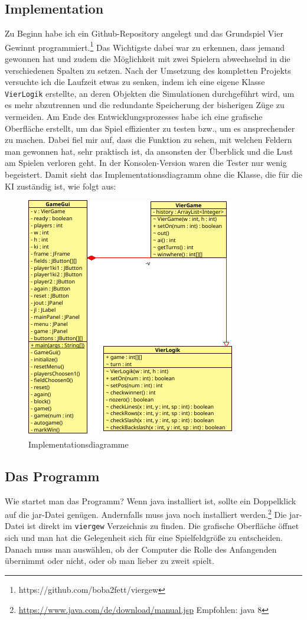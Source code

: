 \documentclass[12pt,a4paper]{article}
\def\code#1{\texttt{#1}}
\begin{document}
	\subsection{Implementation}
	Zu Beginn habe ich ein Github-Repository angelegt und das Grundspiel Vier Gewinnt programmiert.\footnote{https://github.com/boba2fett/viergew} Das Wichtigste dabei war zu erkennen, dass jemand gewonnen hat und zudem die Möglichkeit mit zwei Spielern abwechselnd in die verschiedenen Spalten zu setzen.
	Nach der Umsetzung des kompletten Projekts versuchte ich die Laufzeit etwas zu senken, indem ich eine eigene Klasse \code{VierLogik} erstellte, an deren Objekten die Simulationen durchgeführt wird, um es mehr abzutrennen und die redundante Speicherung der bisherigen Züge zu vermeiden. Am Ende des Entwicklungsprozesses habe ich eine grafische Oberfläche erstellt, um das Spiel effizienter zu testen bzw., um es ansprechender zu machen. Dabei fiel mir auf, dass die Funktion zu sehen, mit welchen Feldern man gewonnen hat, sehr praktisch ist, da ansonsten der Überblick und die Lust am Spielen verloren geht. In der Konsolen-Version waren die Tester nur wenig begeistert.
	Damit sieht das Implementationsdiagramm ohne die Klasse, die für die KI zuständig ist, wie folgt aus:
\begin{figure}[h]
	\centering
	\label{Impementationsdiagramm}
	\includegraphics[width=0.7\linewidth, height=0.4\textheight]{maybe/Klassendiagramme}
	\caption{Implementationsdiagramme}
	\label{fig:klassendiagramme}
\end{figure}
\newpage
	\subsection{Das Programm}
	Wie startet man das Programm? Wenn java installiert ist, sollte ein Doppelklick auf die jar-Datei genügen. Andernfalls muss java noch installiert werden.\footnote{\url{https://www.java.com/de/download/manual.jsp} \space{} Empfohlen: java 8} Die jar-Datei ist direkt im \code{viergew} Verzeichnis zu finden. Die grafische Oberfläche öffnet sich und man hat die Gelegenheit sich für eine Spielfeldgröße zu entscheiden. Danach muss man auswählen, ob der Computer die Rolle des Anfangenden übernimmt oder nicht, oder ob man lieber zu zweit spielt.\\
\end{document}
